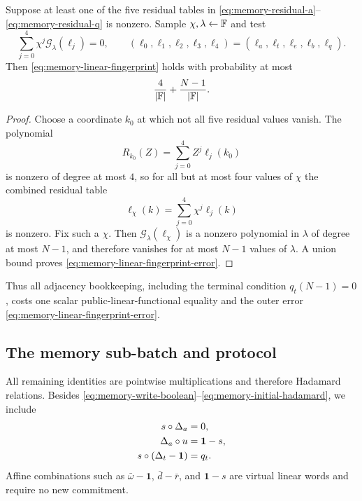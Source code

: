 \begin{lemma}
\label{lem:memory-linear-fingerprint}
Suppose at least one of the five residual tables in \eqref{eq:memory-residual-a}--\eqref{eq:memory-residual-q} is nonzero.  Sample $\chi,\lambda\leftarrow\mathbb{F}$ and test
\begin{equation}
  \sum_{j=0}^{4}\chi^j\mathcal G_\lambda(\ell_j)=0,
  \qquad
  (\ell_0,\ell_1,\ell_2,\ell_3,\ell_4)
  =(\ell_a,\ell_t,\ell_e,\ell_b,\ell_q).
  \label{eq:memory-linear-fingerprint}
\end{equation}
Then \eqref{eq:memory-linear-fingerprint} holds with probability at most
\begin{equation}
  \frac{4}{|\mathbb{F}|}+\frac{N-1}{|\mathbb{F}|}.
  \label{eq:memory-linear-fingerprint-error}
\end{equation}
\end{lemma}

\begin{proof}
Choose a coordinate $k_0$ at which not all five residual values vanish.  The polynomial
\[
  R_{k_0}(Z)=\sum_{j=0}^{4}Z^j\ell_j(k_0)
\]
is nonzero of degree at most $4$, so for all but at most four values of $\chi$ the combined residual table
\[
  \ell_\chi(k)=\sum_{j=0}^{4}\chi^j\ell_j(k)
\]
is nonzero.  Fix such a $\chi$.  Then $\mathcal G_\lambda(\ell_\chi)$ is a nonzero polynomial in $\lambda$ of degree at most $N-1$, and therefore vanishes for at most $N-1$ values of $\lambda$.  A union bound proves \eqref{eq:memory-linear-fingerprint-error}.
\end{proof}

Thus all adjacency bookkeeping, including the terminal condition $q_t(N-1)=0$, costs one scalar public-linear-functional equality and the outer error \eqref{eq:memory-linear-fingerprint-error}.

\subsection{The memory sub-batch and protocol}
\label{sec:memory-protocol}

All remaining identities are pointwise multiplications and therefore Hadamard relations.  Besides \eqref{eq:memory-write-boolean}--\eqref{eq:memory-initial-hadamard}, we include
\begin{align}
  s\circ\Delta_a&=0,
  \label{eq:memory-batch-same-zero}\\
  \Delta_a\circ u&=\mathbf1-s,
  \label{eq:memory-batch-same-inverse}\\
  s\circ(\Delta_t-\mathbf1)&=q_t.
  \label{eq:memory-batch-time}
\end{align}
Affine combinations such as $\bar\omega-\mathbf1$, $\bar d-\bar r$, and $\mathbf1-s$ are virtual linear words and require no new commitment.

